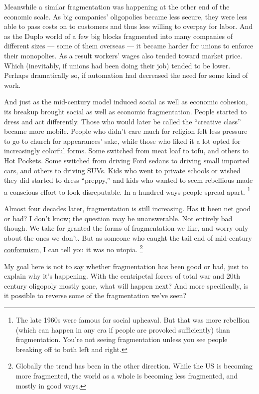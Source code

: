 Meanwhile a similar fragmentation was happening at the other end of the
economic scale. As big companies' oligopolies became less secure, they
were less able to pass costs on to customers and thus less willing to
overpay for labor. And as the Duplo world of a few big blocks fragmented
into many companies of different sizes --- some of them overseas --- it
became harder for unions to enforce their monopolies. As a result
workers' wages also tended toward market price. Which (inevitably, if
unions had been doing their job) tended to be lower. Perhaps
dramatically so, if automation had decreased the need for some kind of
work.

And just as the mid-century model induced social as well as economic
cohesion, its breakup brought social as well as economic fragmentation.
People started to dress and act differently. Those who would later be
called the ``creative class'' became more mobile. People who didn't care
much for religion felt less pressure to go to church for appearances'
sake, while those who liked it a lot opted for increasingly colorful
forms. Some switched from meat loaf to tofu, and others to Hot Pockets.
Some switched from driving Ford sedans to driving small imported cars,
and others to driving SUVs. Kids who went to private schools or wished
they did started to dress ``preppy,'' and kids who wanted to seem
rebellious made a conscious effort to look disreputable. In a hundred
ways people spread apart. \footnote{The late 1960s were famous for social upheaval. But that was
more rebellion (which can happen in any era if people are provoked
sufficiently) than fragmentation. You're not seeing fragmentation unless
you see people breaking off to both left and right.}

Almost four decades later, fragmentation is still increasing. Has it
been net good or bad? I don't know; the question may be unanswerable.
Not entirely bad though. We take for granted the forms of fragmentation
we like, and worry only about the ones we don't. But as someone who
caught the tail end of mid-century
\href{https://books.google.com/ngrams/graph?content=well-adjusted&year_start=1800&year_end=2000&corpus=15&smoothing=3}{conformism},
I can tell you it was no utopia. \footnote{Globally the trend has been in the other direction. While the
US is becoming more fragmented, the world as a whole is becoming less
fragmented, and mostly in good ways.}

My goal here is not to say whether fragmentation has been good or bad,
just to explain why it's happening. With the centripetal forces of total
war and 20th century oligopoly mostly gone, what will happen next? And
more specifically, is it possible to reverse some of the fragmentation
we've seen?

